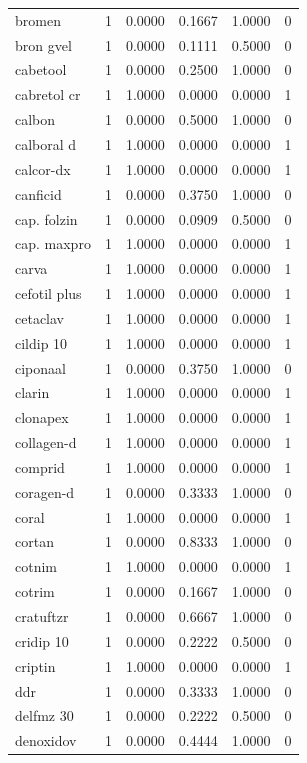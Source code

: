 \begin{longtable}{p{3.0cm}rrrrr}
bromen & 1 & 0.0000 & 0.1667 & 1.0000 & 0 \\
bron gvel & 1 & 0.0000 & 0.1111 & 0.5000 & 0 \\
cabetool & 1 & 0.0000 & 0.2500 & 1.0000 & 0 \\
cabretol cr & 1 & 1.0000 & 0.0000 & 0.0000 & 1 \\
calbon & 1 & 0.0000 & 0.5000 & 1.0000 & 0 \\
calboral d & 1 & 1.0000 & 0.0000 & 0.0000 & 1 \\
calcor-dx & 1 & 1.0000 & 0.0000 & 0.0000 & 1 \\
canficid & 1 & 0.0000 & 0.3750 & 1.0000 & 0 \\
cap. folzin & 1 & 0.0000 & 0.0909 & 0.5000 & 0 \\
cap. maxpro & 1 & 1.0000 & 0.0000 & 0.0000 & 1 \\
carva & 1 & 1.0000 & 0.0000 & 0.0000 & 1 \\
cefotil plus & 1 & 1.0000 & 0.0000 & 0.0000 & 1 \\
cetaclav & 1 & 1.0000 & 0.0000 & 0.0000 & 1 \\
cildip 10 & 1 & 1.0000 & 0.0000 & 0.0000 & 1 \\
ciponaal & 1 & 0.0000 & 0.3750 & 1.0000 & 0 \\
clarin & 1 & 1.0000 & 0.0000 & 0.0000 & 1 \\
clonapex & 1 & 1.0000 & 0.0000 & 0.0000 & 1 \\
collagen-d & 1 & 1.0000 & 0.0000 & 0.0000 & 1 \\
comprid & 1 & 1.0000 & 0.0000 & 0.0000 & 1 \\
coragen-d & 1 & 0.0000 & 0.3333 & 1.0000 & 0 \\
coral & 1 & 1.0000 & 0.0000 & 0.0000 & 1 \\
cortan & 1 & 0.0000 & 0.8333 & 1.0000 & 0 \\
cotnim & 1 & 1.0000 & 0.0000 & 0.0000 & 1 \\
cotrim & 1 & 0.0000 & 0.1667 & 1.0000 & 0 \\
cratuftzr & 1 & 0.0000 & 0.6667 & 1.0000 & 0 \\
cridip 10 & 1 & 0.0000 & 0.2222 & 0.5000 & 0 \\
criptin & 1 & 1.0000 & 0.0000 & 0.0000 & 1 \\
ddr & 1 & 0.0000 & 0.3333 & 1.0000 & 0 \\
delfmz 30 & 1 & 0.0000 & 0.2222 & 0.5000 & 0 \\
denoxidov & 1 & 0.0000 & 0.4444 & 1.0000 & 0 \\

\end{longtable}
